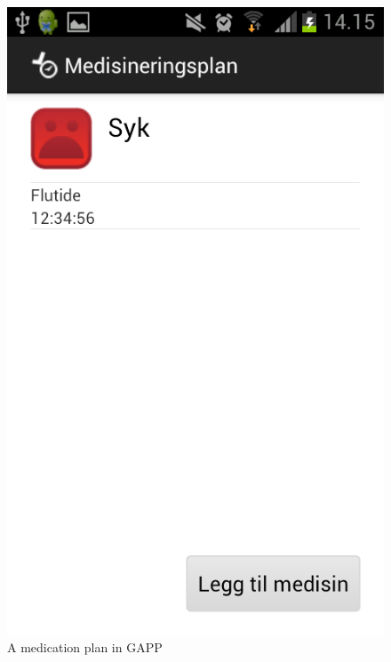\begin{figure}
	\begin{minipage}[b]{0.4\linewidth}
		\centering
		\includegraphics[width=0.20\paperwidth]{Pictures/Screenshots/gapp_plan.png}
	\caption{A medication plan in GAPP}
	\label{fig:gapp-plan}
	\end{minipage}
	\hspace{3cm}
	\begin{minipage}[b]{0.4\linewidth}
		\centering

\end{minipage}
\end{figure}
